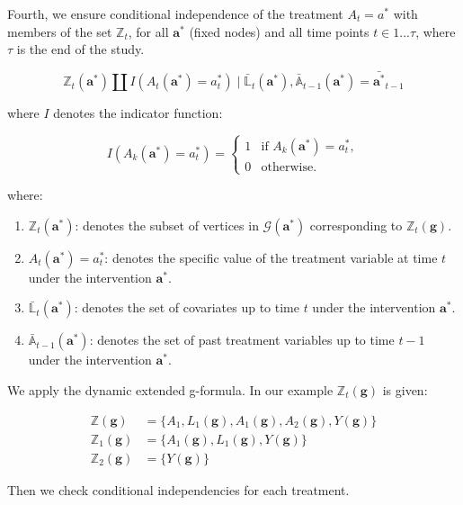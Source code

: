 \documentclass[
  single column]{article}
\providecommand{\tightlist}{%
  \setlength{\itemsep}{0pt}\setlength{\parskip}{0pt}}\usepackage{longtable,booktabs,array}
\begin{document}
Fourth, we ensure conditional independence of the treatment
\(A_t = a^*\) with members of the set \(\mathbb{Z}_t\), for all
\(\mathbf{a}^*\) (fixed nodes) and all time points \(t \in 1...\tau\),
where \(\tau\) is the end of the study.

\[
\mathbb{Z}_t(\mathbf{a}^*) \coprod I(A_t(\mathbf{a}^*) = a^*_t) \mid \bar{\mathbb{L}}_t(\mathbf{a}^*), \bar{\mathbb{A}}_{t-1}(\mathbf{a}^*) = \bar{\mathbf{a}^*}_{t-1}
\]

where \(I\) denotes the indicator function:

\[
I(A_k(\mathbf{a}^*) = a^*_t) = 
\begin{cases} 
1 & \text{if } A_k(\mathbf{a}^*) = a^*_t, \\
0 & \text{otherwise}.
\end{cases}
\]

where:

\begin{enumerate}
\def\labelenumi{\arabic{enumi}.}
\tightlist
\item
  \textbf{\(\mathbb{Z}_t(\mathbf{a}^*)\)}: denotes the subset of
  vertices in \(\mathcal{G}(\mathbf{a}^*)\) corresponding to
  \(\mathbb{Z}_t(\mathbf{g})\).
\item
  \textbf{\(A_t(\mathbf{a}^*) = a^*_t\)}: denotes the specific value of
  the treatment variable at time \(t\) under the intervention
  \(\mathbf{a}^*\).
\item
  \textbf{\(\bar{\mathbb{L}}_t(\mathbf{a}^*)\)}: denotes the set of
  covariates up to time \(t\) under the intervention \(\mathbf{a}^*\).
\item
  \textbf{\(\bar{\mathbb{A}}_{t-1}(\mathbf{a}^*)\)}: denotes the set of
  past treatment variables up to time \(t-1\) under the intervention
  \(\mathbf{a}^*\).
\end{enumerate}

We apply the dynamic extended g-formula. In our example
\(\mathbb{Z}_t(\mathbf{g})\) is given:

\[
\begin{aligned}
\mathbb{Z}(\mathbf{g}) &= \{A_1, L_1(\mathbf{g}), A_1(\mathbf{g}), A_2(\mathbf{g}), Y(\mathbf{g})\} \\
\mathbb{Z}_1(\mathbf{g}) &= \{A_1(\mathbf{g}), L_1(\mathbf{g}), Y(\mathbf{g})\} \\
\mathbb{Z}_2(\mathbf{g}) &= \{Y(\mathbf{g})\}
\end{aligned}
\]

Then we check conditional independencies for each treatment.
\end{document}
